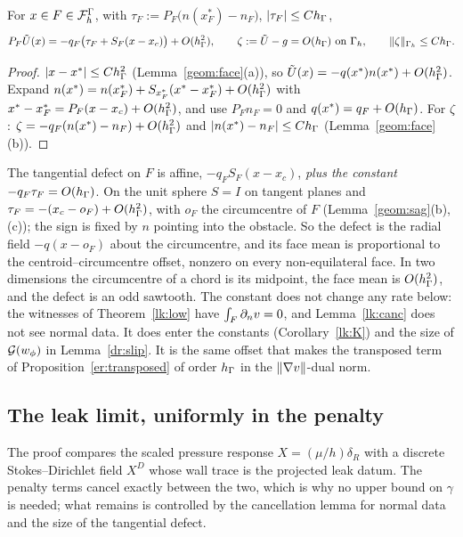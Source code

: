 \begin{lemma}\label{lk:defect}
For $x\in F\in\mathcal F_h^\Gamma$, with $\tau_F:=P_F\bigl(n(x^\ast_F)-n_F\bigr)$, $|\tau_F|\le Ch_\Gamma$,
\[
P_F\Ut(x)=-q_F\bigl(\tau_F+S_F(x-x_c)\bigr)+O(\hG^2),\qquad\zeta:=\Ut-g=O(\hG)\ \text{on }\Gh,\qquad\norm\zeta_{\Gh}\le C\hG .
\]
\end{lemma}
\begin{proof}
$|x-x^\ast|\le Ch_\Gamma^2$ (Lemma~\ref{geom:face}(a)), so $\tilde U(x)=-q(x^\ast)n(x^\ast)+O(h_\Gamma^2)$. Expand $n(x^\ast)=n(x^\ast_F)+S_{x^\ast_F}(x^\ast-x^\ast_F)+O(h_\Gamma^2)$ with $x^\ast-x^\ast_F=P_F(x-x_c)+O(h_\Gamma^2)$, and use $P_Fn_F=0$ and $q(x^\ast)=q_F+O(h_\Gamma)$. For $\zeta$: $\zeta=-q_F(n(x^\ast)-n_F)+O(h_\Gamma^2)$ and $|n(x^\ast)-n_F|\le Ch_\Gamma$ (Lemma~\ref{geom:face}(b)).
\end{proof}

\begin{remark}\label{lk:rem:facemean}
The tangential defect on $F$ is affine, $-q_FS_F(x-x_c)$, \emph{plus the constant} $-q_F\tau_F=O(h_\Gamma)$. On the unit sphere $S=I$ on tangent planes and $\tau_F=-(x_c-o_F)+O(h_\Gamma^2)$, with $o_F$ the circumcentre of $F$ (Lemma~\ref{geom:sag}(b),(c)); the sign is fixed by $n$ pointing into the obstacle. So the defect is the radial field $-q(x-o_F)$ about the circumcentre, and its face mean is proportional to the centroid--circumcentre offset, nonzero on every non-equilateral face. In two dimensions the circumcentre of a chord is its midpoint, the face mean is $O(h_\Gamma^2)$, and the defect is an odd sawtooth. The constant does not change any rate below: the witnesses of Theorem~\ref{lk:low} have $\int_F\partial_n v=0$, and Lemma~\ref{lk:canc} does not see normal data. It does enter the constants (Corollary~\ref{lk:K}) and the size of $\mathcal G(w_\phi)$ in Lemma~\ref{dr:slip}. It is the same offset that makes the transposed term of Proposition~\ref{er:transposed} of order $h_\Gamma$ in the $\lVert \nabla v\rVert$-dual norm.
\end{remark}

\subsection{The leak limit, uniformly in the penalty}
The proof compares the scaled pressure response $X=(\mu/h)\delta_R$ with a discrete Stokes--Dirichlet field $X^D$ whose wall trace is the projected leak datum. The penalty terms cancel exactly between the two, which is why no upper bound on $\gamma$ is needed; what remains is controlled by the cancellation lemma for normal data and the size of the tangential defect.


